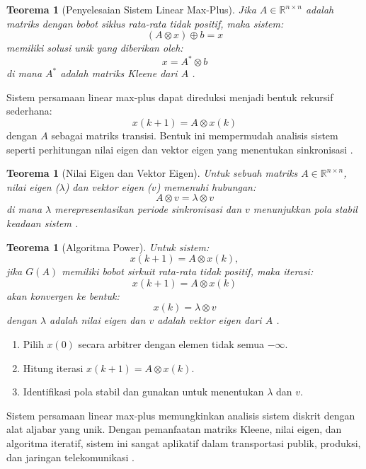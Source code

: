 \documentclass{file/TA-ITS}
\newtheorem{teorema}[definisi]{Teorema}
\theoremstyle{definition}
\theoremstyle{definition}
\theoremstyle{plain}
\newcommand{\Real}{\mathbb{R}}
\begin{document}
\begin{teorema}[Penyelesaian Sistem Linear Max-Plus]
Jika \(A \in \Real^{n \times n}\) adalah matriks dengan bobot siklus rata-rata tidak positif, maka sistem:
\[
(A \otimes x) \oplus b = x
\]
memiliki solusi unik yang diberikan oleh:
\[
x = A^* \otimes b
\]
di mana \(A^*\) adalah matriks Kleene dari \(A\) \cite{baccelli}.
\end{teorema}

Sistem persamaan linear max-plus dapat direduksi menjadi bentuk rekursif sederhana:
\[
x(k+1) = A \otimes x(k)
\]
dengan \(A\) sebagai matriks transisi. Bentuk ini mempermudah analisis sistem seperti perhitungan nilai eigen dan vektor eigen yang menentukan sinkronisasi \cite{andro2020}.

\begin{teorema}[Nilai Eigen dan Vektor Eigen]
Untuk sebuah matriks \(A \in \Real^{n \times n}\), nilai eigen (\(\lambda\)) dan vektor eigen (\(v\)) memenuhi hubungan:
\[
A \otimes v = \lambda \otimes v
\]
di mana \(\lambda\) merepresentasikan periode sinkronisasi dan \(v\) menunjukkan pola stabil keadaan sistem \cite{baccelli}.
\end{teorema}

\begin{teorema}[Algoritma Power]
Untuk sistem:
\[
x(k+1) = A \otimes x(k),
\]
jika \(G(A)\) memiliki bobot sirkuit rata-rata tidak positif, maka iterasi:
\[
x(k+1) = A \otimes x(k)
\]
akan konvergen ke bentuk:
\[
x(k) = \lambda \otimes v
\]
dengan \(\lambda\) adalah nilai eigen dan \(v\) adalah vektor eigen dari \(A\) \cite{andro2020}.
\end{teorema}

\begin{enumerate}
    \item Pilih \(x(0)\) secara arbitrer dengan elemen tidak semua \(-\infty\).
    \item Hitung iterasi \(x(k+1) = A \otimes x(k)\).
    \item Identifikasi pola stabil dan gunakan untuk menentukan \(\lambda\) dan \(v\).
\end{enumerate}

Sistem persamaan linear max-plus memungkinkan analisis sistem diskrit dengan alat aljabar yang unik. Dengan pemanfaatan matriks Kleene, nilai eigen, dan algoritma iteratif, sistem ini sangat aplikatif dalam transportasi publik, produksi, dan jaringan telekomunikasi \cite{andro2020, subiono2015minmaxplus}.

\pagebreak
\end{document}
